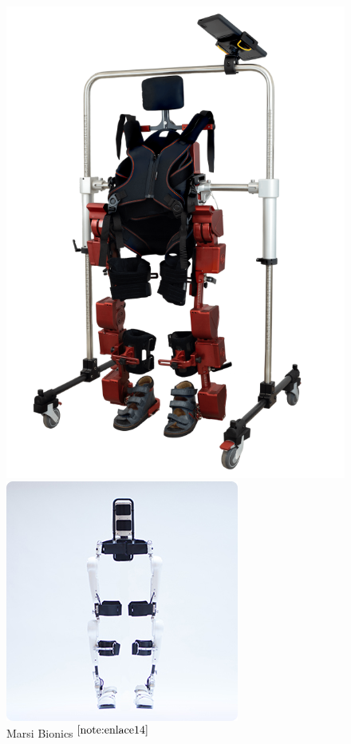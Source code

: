 \begin{figure}[ht!]
\begin{minipage}{0.2\linewidth}
    	\includegraphics[width=\linewidth]{figs/marsi.png}
    	\caption*{\centering Marsi Bionics $^{\ref{note:enlace14}}$}
    \end{minipage}
    \hspace{3cm}
    \begin{minipage}{0.25\linewidth}
    	\centering
    	\includegraphics[width=\linewidth]{figs/cyberdyne.jpg}

\end{minipage}
\end{figure}

